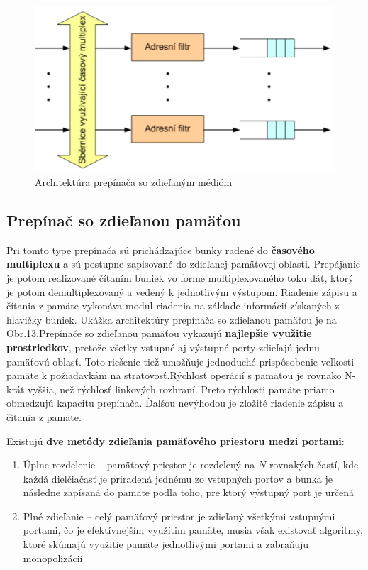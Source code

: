 \begin{figure}[ht]
\centering
  \begin{center}
    \includegraphics[scale=0.8]{BPC-HWS/images/zdiel_medium.png}
  \end{center}
  \caption[Architektúra prepínača so zdieľaným médióm]{Architektúra prepínača so zdieľaným médióm}
\end{figure}

\newpage
\subsection{Prepínač so zdieľanou pamäťou}
Pri tomto type prepínača sú prichádzajúce bunky radené do \textbf{časového multiplexu} a sú postupne zapisované do zdieľanej pamäťovej oblasti. Prepájanie je potom realizované čítaním buniek vo forme multiplexovaného toku dát, ktorý je potom demultiplexovaný a vedený k jednotlivým výstupom. Riadenie zápisu a čítania z pamäte vykonáva modul riadenia na základe informácií získaných z hlavičky buniek. Ukážka architektúry prepínača so zdieľanou pamäťou je na Obr.13.Prepínače so zdieľanou pamäťou vykazujú \textbf{najlepšie využitie prostriedkov}, pretože všetky vstupné aj výstupné porty zdieľajú jednu pamäťovú oblasť. Toto riešenie tiež umožňuje jednoduché prispôsobenie veľkosti pamäte k požiadavkám na stratovosť.Rýchlosť operácií s pamäťou je rovnako N-krát vyššia, než rýchlosť linkových rozhraní. Preto rýchlosti pamäte priamo obmedzujú kapacitu prepínača. Ďalšou nevýhodou je zložité riadenie zápisu a čítania z pamäte.\newline


Existujú \textbf{dve metódy zdieľania pamäťového priestoru medzi portami}:
\begin{enumerate}
    \item Úplne rozdelenie -- pamäťový priestor je rozdelený na $N$ rovnakých častí, kde každá dielčiačasť je priradená jednému zo vstupných portov a bunka je následne zapísaná do pamäte podľa toho, pre ktorý výstupný port je určená
    \item Plné zdieľanie -- celý pamäťový priestor je zdieľaný všetkými vstupnými portami, čo je efektívnejším využítim pamäte, musia však existovať algoritmy, ktoré skúmajú využitie pamäte jednotlivými portami a zabraňuju monopolizácií
\end{enumerate}

